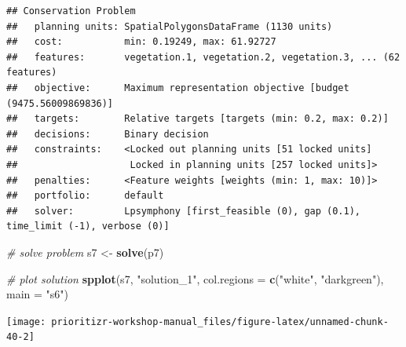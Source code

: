 \documentclass[12pt,]{book}
\newenvironment{Shaded}{\begin{snugshade}}{\end{snugshade}}
\newcommand{\KeywordTok}[1]{\textcolor[rgb]{0.13,0.29,0.53}{\textbf{#1}}}
\newcommand{\DataTypeTok}[1]{\textcolor[rgb]{0.13,0.29,0.53}{#1}}
\newcommand{\FloatTok}[1]{\textcolor[rgb]{0.00,0.00,0.81}{#1}}
\newcommand{\StringTok}[1]{\textcolor[rgb]{0.31,0.60,0.02}{#1}}
\newcommand{\CommentTok}[1]{\textcolor[rgb]{0.56,0.35,0.01}{\textit{#1}}}
\newcommand{\OperatorTok}[1]{\textcolor[rgb]{0.81,0.36,0.00}{\textbf{#1}}}
\newcommand{\NormalTok}[1]{#1}
\begin{document}
\begin{verbatim}
## Conservation Problem
##   planning units: SpatialPolygonsDataFrame (1130 units)
##   cost:           min: 0.19249, max: 61.92727
##   features:       vegetation.1, vegetation.2, vegetation.3, ... (62 features)
##   objective:      Maximum representation objective [budget (9475.56009869836)]
##   targets:        Relative targets [targets (min: 0.2, max: 0.2)]
##   decisions:      Binary decision 
##   constraints:    <Locked out planning units [51 locked units]
##                    Locked in planning units [257 locked units]>
##   penalties:      <Feature weights [weights (min: 1, max: 10)]>
##   portfolio:      default
##   solver:         Lpsymphony [first_feasible (0), gap (0.1), time_limit (-1), verbose (0)]
\end{verbatim}

\begin{Shaded}
\begin{Highlighting}[]
\CommentTok{# solve problem}
\NormalTok{s7 <-}\StringTok{ }\KeywordTok{solve}\NormalTok{(p7)}

\CommentTok{# plot solution}
\KeywordTok{spplot}\NormalTok{(s7, }\StringTok{"solution_1"}\NormalTok{, }\DataTypeTok{col.regions =} \KeywordTok{c}\NormalTok{(}\StringTok{"white"}\NormalTok{, }\StringTok{"darkgreen"}\NormalTok{), }\DataTypeTok{main =} \StringTok{"s6"}\NormalTok{)}
\end{Highlighting}
\end{Shaded}

\begin{center}\texttt{[image: prioritizr-workshop-manual\_files/figure-latex/unnamed-chunk-40-2]} \end{center}

\begin{Shaded}
\end{Shaded}
\end{document}
